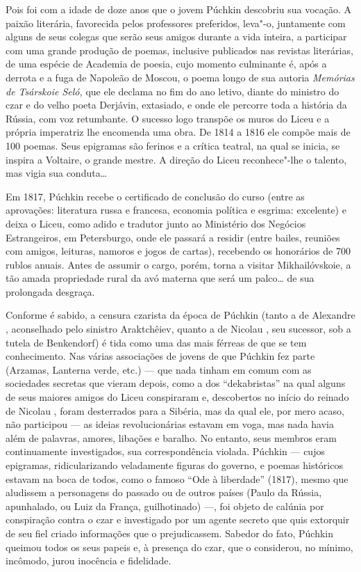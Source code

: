 Pois foi com a idade de doze anos que o jovem Púchkin descobriu sua
vocação. A paixão literária, favorecida pelos professores preferidos,
leva"-o, juntamente com alguns de seus colegas que serão seus amigos
durante a vida inteira, a participar com uma grande produção de poemas,
inclusive publicados nas revistas literárias, de uma espécie de Academia
de poesia, cujo momento culminante é, após a derrota e a fuga de
Napoleão de Moscou, o poema longo de sua autoria \emph{Memórias de
Tsárskoie Seló,} que ele declama no fim do ano letivo, diante do
ministro do czar e do velho poeta Derjávin, extasiado, e onde ele
percorre toda a história da Rússia, com voz retumbante. O sucesso logo
transpõe os muros do Liceu e a própria imperatriz lhe encomenda uma
obra. De 1814 a 1816 ele compõe mais de 100 poemas. Seus epigramas são
ferinos e a crítica teatral, na qual se inicia, se inspira a Voltaire, o
grande mestre. A direção do Liceu reconhece"-lhe o talento, mas vigia sua
conduta\ldots{}

Em 1817, Púchkin recebe o certificado de conclusão do curso (entre as
aprovações: literatura russa e francesa, economia política e esgrima:
excelente) e deixa o Liceu, como adido e tradutor junto ao Ministério
dos Negócios Estrangeiros, em Petersburgo, onde ele passará a residir
(entre bailes, reuniões com amigos, leituras, namoros e jogos de
cartas), recebendo os honorários de 700 rublos anuais. Antes de assumir
o cargo, porém, torna a visitar Mikhailóvskoie, a tão amada propriedade
rural da avó materna que será um palco\ldots{} de sua prolongada desgraça.

Conforme é sabido, a censura czarista da época de Púchkin (tanto a de
Alexandre , aconselhado pelo sinistro Araktchêiev, quanto a de Nicolau
, seu sucessor, sob a tutela de Benkendorf) é tida como uma das mais
férreas de que se tem conhecimento. Nas várias associações de jovens de
que Púchkin fez parte (Arzamas, Lanterna verde, etc.) --- que nada tinham em
comum com as sociedades secretas que vieram depois, como a dos ``dekabristas'' na qual alguns de seus maiores amigos do Liceu conspiraram
e, descobertos no início do reinado de Nicolau , foram desterrados para
a Sibéria, mas da qual ele, por mero acaso, não participou --- as ideias revolucionárias
estavam em voga, mas nada havia além de palavras, amores, libações e
baralho. No entanto, seus membros eram continuamente investigados, sua
correspondência violada. Púchkin --- cujos epigramas, ridicularizando
veladamente figuras do governo, e poemas históricos estavam na boca de
todos, como o famoso ``Ode à liberdade'' (1817), mesmo que aludissem a
personagens do passado ou de outros países (Paulo  da Rússia,
apunhalado, ou Luiz  da França, guilhotinado) ---, foi objeto de
calúnia por conspiração contra o czar e investigado por um agente
secreto que quis extorquir de seu fiel criado informações que o
prejudicassem. Sabedor do fato, Púchkin queimou todos os seus papeis e,
à presença do czar, que o considerou, no mínimo, incômodo, jurou
inocência e fidelidade.

